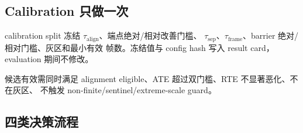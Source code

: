 \documentclass[UTF8,a4paper,11pt]{ctexart}
\begin{document}
\subsection{Calibration 只做一次}

calibration split 冻结 $\tau_{\mathrm{align}}$、端点绝对/相对改善门槛、
$\tau_{\mathrm{sep}}$、$\tau_{\mathrm{frame}}$、barrier 绝对/相对门槛、灰区和最小有效
帧数。冻结值与 config hash 写入 result card，evaluation 期间不修改。

候选有效需同时满足 alignment eligible、ATE 超过双门槛、RTE 不显著恶化、不在灰区、
不触发 non-finite/sentinel/extreme-scale guard。

\subsection{四类决策流程}
\end{document}
